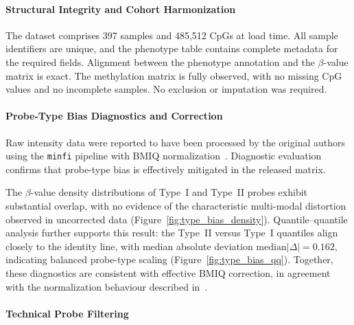 \paragraph{Structural Integrity and Cohort Harmonization}
\label{par:gse69914_step0}
The dataset comprises 397 samples and 485{,}512 CpGs at load time. All sample identifiers are unique, and the phenotype table contains complete metadata for the required fields.
Alignment between the phenotype annotation and the $\beta$-value matrix is exact. The methylation matrix is fully observed, with no missing CpG values and no incomplete samples. No exclusion or imputation was required.

\paragraph{Probe-Type Bias Diagnostics and Correction}
\label{par:gse69914_typebias}

Raw intensity data were reported to have been processed by the original authors using the \texttt{minfi} pipeline with BMIQ normalization~\cite{GSE69914}. Diagnostic evaluation confirms that probe-type bias is effectively mitigated in the released matrix.

The $\beta$-value density distributions of Type~I and Type~II probes exhibit substantial overlap, with no evidence of the characteristic multi-modal distortion observed in uncorrected data (Figure~\ref{fig:type_bias_density}). Quantile--quantile analysis further supports this result: the Type~II versus Type~I quantiles align closely to the identity line, with median absolute deviation $\mathrm{median}|\Delta| = 0.162$, indicating balanced probe-type scaling (Figure~\ref{fig:type_bias_qq}).
Together, these diagnostics are consistent with effective BMIQ correction, in agreement with the normalization behaviour described in~\cite{Teschendorff2013BMIQ, maksimovic2012, Wang2015Normalization450K}.

\paragraph{Technical Probe Filtering}
\label{par:gse69914_step2}

